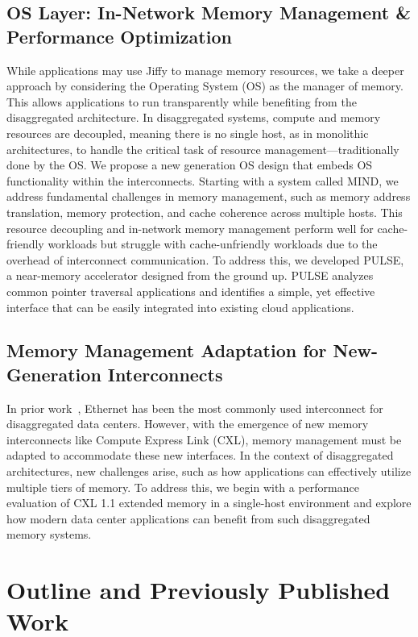 \subsection{OS Layer: In-Network Memory Management \& Performance Optimization}

While applications may use Jiffy to manage memory resources, we take a deeper approach by considering the Operating System (OS) as the manager of memory. This allows applications to run transparently while benefiting from the disaggregated architecture. In disaggregated systems, compute and memory resources are decoupled, meaning there is no single host, as in monolithic architectures, to handle the critical task of resource management—traditionally done by the OS. We propose a new generation OS design that embeds OS functionality within the interconnects. Starting with a system called MIND, we address fundamental challenges in memory management, such as memory address translation, memory protection, and cache coherence across multiple hosts. This resource decoupling and in-network memory management perform well for cache-friendly workloads but struggle with cache-unfriendly workloads due to the overhead of interconnect communication. To address this, we developed PULSE, a near-memory accelerator designed from the ground up. PULSE analyzes common pointer traversal applications and identifies a simple, yet effective interface that can be easily integrated into existing cloud applications.

\subsection{Memory Management Adaptation for New-Generation Interconnects}
In prior work~\cite{mind,legoos}, Ethernet has been the most commonly used interconnect for disaggregated data centers. However, with the emergence of new memory interconnects like Compute Express Link (CXL), memory management must be adapted to accommodate these new interfaces. In the context of disaggregated architectures, new challenges arise, such as how applications can effectively utilize multiple tiers of memory. To address this, we begin with a performance evaluation of CXL 1.1 extended memory in a single-host environment and explore how modern data center applications can benefit from such disaggregated memory systems.

\section{Outline and Previously Published Work}

